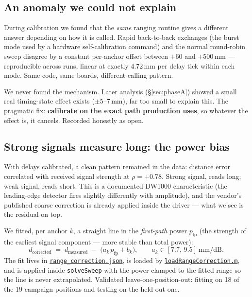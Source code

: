 \documentclass[11pt,a4paper]{article}
\newcommand{\gh}[2]{\href{https://github.com/AdershM-2/UWB_3/blob/main/#1}{\texttt{#2}}}
\newcommand{\code}[1]{\texttt{#1}}
\begin{document}
\subsection{An anomaly we could not explain}
\label{sec:anomaly}

During calibration we found that the \emph{same} ranging routine gives a different
answer depending on how it is called. Rapid back-to-back exchanges (the burst mode
used by a hardware self-calibration command) and the normal round-robin sweep
disagree by a constant per-anchor offset between $+60$ and $+500$\,mm ---
reproducible across runs, linear at exactly 4.72\,mm per delay tick within each
mode. Same code, same boards, different calling pattern.

We never found the mechanism. Later analysis (\S\ref{sec:phaseA}) showed a small
real timing-state effect exists ($\pm$5--7\,mm), far too small to explain this.
The pragmatic fix: \textbf{calibrate on the exact path production uses}, so
whatever the effect is, it cancels. Recorded honestly as open.

\subsection{Strong signals measure long: the power bias}
\label{sec:powerbias}

With delays calibrated, a clean pattern remained in the data: distance error
correlated with received signal strength at $\rho = +0.78$. Strong signal, reads
long; weak signal, reads short. This is a documented DW1000 characteristic (the
leading-edge detector fires slightly differently with amplitude), and the vendor's
published coarse correction is already applied inside the driver --- what we see is
the residual on top.

We fitted, per anchor $k$, a straight line in the \emph{first-path} power
$p_{\mathrm{fp}}$ (the strength of the earliest signal component --- more stable
than total power):
\begin{equation}
d_{\text{corrected}} \;=\; d_{\text{measured}} \;-\;
\big(a_k\, p_{\mathrm{fp}} + b_k\big),
\qquad a_k \in [7.7,\,9.5]\ \text{mm/dB}.
\end{equation}
The fit lives in \gh{matlab/config/range\_correction.json}{range\_correction.json},
is loaded by \gh{matlab/+dune/loadRangeCorrection.m}{loadRangeCorrection.m}, and is
applied inside \code{solveSweep} with the power clamped to the fitted range so the
line is never extrapolated. Validated leave-one-position-out: fitting on 18 of the
19 campaign positions and testing on the held-out one.
\end{document}
